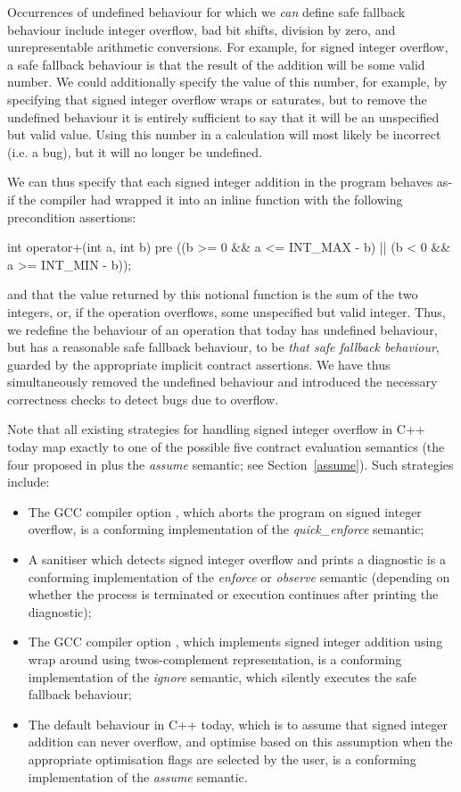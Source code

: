 Occurrences of undefined behaviour for which we \emph{can} define safe fallback behaviour include integer overflow, bad bit shifts, division by zero, and unrepresentable arithmetic conversions. For example, for signed integer overflow, a safe fallback behaviour is that the result of the addition will be some valid number. We could additionally specify the value of this number, for example, by specifying that signed integer overflow wraps or saturates, but to remove the undefined behaviour it is entirely sufficient to say that it will be an unspecified but valid value. Using this number in a calculation will most likely be incorrect (i.e. a bug), but it will no longer be undefined.

We can thus specify that each signed integer addition in the program behaves as-if the compiler had wrapped it into an inline function with the following precondition assertions:
\begin{codeblock}
int operator+(int a, int b)
pre ((b >= 0 && a <= INT_MAX - b) || (b < 0 && a >= INT_MIN - b));
\end{codeblock}
and that the value returned by this notional function is the sum of the two integers, or, if the operation overflows, some unspecified but valid integer. Thus, we redefine the behaviour of an operation that today has undefined behaviour, but has a reasonable safe fallback behaviour, to be \emph{that safe fallback behaviour}, guarded by the appropriate implicit contract assertions. We have thus simultaneously removed the undefined behaviour and introduced the necessary correctness checks to detect bugs due to overflow.

Note that all existing strategies for handling signed integer overflow in C++ today map exactly to one of the possible five contract evaluation semantics (the four proposed in \cite{P2900R8} plus the \emph{assume} semantic; see Section~\ref{assume}). Such strategies include:
\begin{itemize}
\item The GCC compiler option , which aborts the program on signed integer overflow, is a conforming implementation of the \emph{quick_enforce} semantic;
\item A sanitiser which detects signed integer overflow and prints a diagnostic is a conforming
implementation of the \emph{enforce} or \emph{observe} semantic (depending on whether the
process is terminated or execution continues after printing the diagnostic);
\item The GCC compiler option , which implements signed integer addition using wrap around using twos-complement representation, is a conforming implementation of the \emph{ignore} semantic, which silently executes the safe fallback behaviour;
\item The default behaviour in C++ today, which is to assume that signed integer addition can never overflow, and optimise based on this assumption when the appropriate optimisation flags are selected by the user, is a conforming implementation of the \emph{assume} semantic.
\end{itemize}

